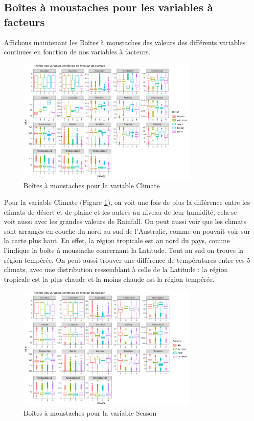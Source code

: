 \documentclass{article}
\begin{document}
\subsection{Boîtes à moustaches pour les variables à facteurs}

Affichons maintenant les Boîtes à moustaches des valeurs des différents variables continues en fonction de nos variables à facteurs. 

\begin{figure}[htp]
    \centering
    \includegraphics[width=0.8\textwidth]{Images/boxplots/boxplot_Climate.png}
    \caption{Boîtes à moustaches pour la variable Climate}
    \label{fig:bp_climate}
\end{figure}

Pour la variable Climate (Figure \ref{fig:bp_climate}), on voit une fois de plus la différence entre les climats de désert et de plaine et les autres au niveau de leur humidité, cela se voit aussi avec les grandes valeurs de Rainfall. On peut aussi voir que les climats sont arrangés en couche du nord au sud de l'Australie, comme on pouvait voir sur la carte plus haut. En effet, la région tropicale est au nord du pays, comme l'indique la boîte à moustache concernant la Latitude. Tout au sud on trouve la région tempérée. On peut aussi trouver une différence de températures entre ces 5 climats, avec une distribution ressemblant à celle de la Latitude : la région tropicale est la plus chaude et la moins chaude est la région tempérée. 

\begin{figure}[htp]
    \centering
    \includegraphics[width=0.8\textwidth]{Images/boxplots/boxplot_Season.png}
    \caption{Boîtes à moustaches pour la variable Season}
    \label{fig:bp_season}
\end{figure}
\end{document}

